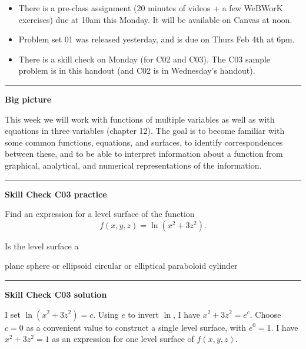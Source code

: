 \documentclass[12pt,letterpaper,noanswers]{exam}
\begin{document}
 \pdfpageheight 11in 
  \pdfpagewidth 8.5in



\begin{itemize}
\item There is a pre-class assignment (20 minutes of videos + a few WeBWorK exercises) due at 10am this Monday.  It will be available on Canvas at noon.
    \item Problem set 01 was released yesterday, and is due on Thurs Feb 4th at 6pm.  
    \item There is a skill check on Monday (for C02 and C03).  The C03 sample problem is in this handout (and C02 is in Wednesday's handout).
\end{itemize}

\hrule
\vspace{0.2cm}

\noindent\textbf{Big picture}

This week we will work with functions of multiple variables as well as with equations in three variables (chapter 12).  The goal is to become familiar with some common functions, equations, and surfaces, to identify correspondences between these, and to be able to interpret information about a function from graphical, analytical, and numerical representations of the information.

\vspace{0.2cm}
\hrule
\vspace{0.2cm}

\noindent\textbf{Skill Check C03 practice}
\begin{questions}
\item Find an expression for a level surface of the function \[f(x,y,z) = \ln{(x^2+3z^2)}.\]

Is the level surface a 

\begin{oneparcheckboxes}
\choice plane
\choice sphere or ellipsoid
\choice circular or elliptical paraboloid
\choice cylinder
\end{oneparcheckboxes}

\end{questions}


\vspace{0.2cm}

\hrule
\vspace{0.2cm}

\noindent\textbf{Skill Check C03 solution}

I set $\ln(x^2 + 3z^2) = c$.  Using $e$ to invert $\ln$, I have $x^2+3z^2 = e^c$.  Choose $c = 0$ as a convenient value to construct a single level surface, with $e^0 = 1$.  I have $x^2 + 3z^2 =1$ as an expression for one level surface of $f(x,y,z)$.
\end{document}
